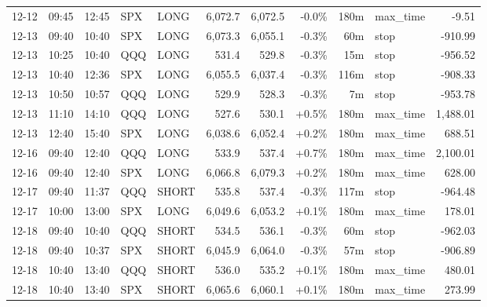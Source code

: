 \documentclass[11pt,a4paper,twoside]{article}
\begin{document}
\begin{center}
\begin{longtable}{>{\color{txtmain}}l l l l l r r r r >{\color{txtmain}}l r}
12-12 & 09:45 & 12:45 & SPX & LONG & 6,072.7 & 6,072.5 & \textcolor{lossred}{-0.0\%} & 180m & max\_time & \textcolor{lossred}{-9.51} \\
12-13 & 09:40 & 10:40 & SPX & LONG & 6,073.3 & 6,055.1 & \textcolor{lossred}{-0.3\%} & 60m & stop & \textcolor{lossred}{-910.99} \\
12-13 & 10:25 & 10:40 & QQQ & LONG & 531.4 & 529.8 & \textcolor{lossred}{-0.3\%} & 15m & stop & \textcolor{lossred}{-956.52} \\
12-13 & 10:40 & 12:36 & SPX & LONG & 6,055.5 & 6,037.4 & \textcolor{lossred}{-0.3\%} & 116m & stop & \textcolor{lossred}{-908.33} \\
12-13 & 10:50 & 10:57 & QQQ & LONG & 529.9 & 528.3 & \textcolor{lossred}{-0.3\%} & 7m & stop & \textcolor{lossred}{-953.78} \\
12-13 & 11:10 & 14:10 & QQQ & LONG & 527.6 & 530.1 & \textcolor{wingreen}{+0.5\%} & 180m & max\_time & \textcolor{wingreen}{1,488.01} \\
12-13 & 12:40 & 15:40 & SPX & LONG & 6,038.6 & 6,052.4 & \textcolor{wingreen}{+0.2\%} & 180m & max\_time & \textcolor{wingreen}{688.51} \\
12-16 & 09:40 & 12:40 & QQQ & LONG & 533.9 & 537.4 & \textcolor{wingreen}{+0.7\%} & 180m & max\_time & \textcolor{wingreen}{2,100.01} \\
12-16 & 09:40 & 12:40 & SPX & LONG & 6,066.8 & 6,079.3 & \textcolor{wingreen}{+0.2\%} & 180m & max\_time & \textcolor{wingreen}{628.00} \\
12-17 & 09:40 & 11:37 & QQQ & SHORT & 535.8 & 537.4 & \textcolor{lossred}{-0.3\%} & 117m & stop & \textcolor{lossred}{-964.48} \\
12-17 & 10:00 & 13:00 & SPX & LONG & 6,049.6 & 6,053.2 & \textcolor{wingreen}{+0.1\%} & 180m & max\_time & \textcolor{wingreen}{178.01} \\
12-18 & 09:40 & 10:40 & QQQ & SHORT & 534.5 & 536.1 & \textcolor{lossred}{-0.3\%} & 60m & stop & \textcolor{lossred}{-962.03} \\
12-18 & 09:40 & 10:37 & SPX & SHORT & 6,045.9 & 6,064.0 & \textcolor{lossred}{-0.3\%} & 57m & stop & \textcolor{lossred}{-906.89} \\
12-18 & 10:40 & 13:40 & QQQ & SHORT & 536.0 & 535.2 & \textcolor{wingreen}{+0.1\%} & 180m & max\_time & \textcolor{wingreen}{480.01} \\
12-18 & 10:40 & 13:40 & SPX & SHORT & 6,065.6 & 6,060.1 & \textcolor{wingreen}{+0.1\%} & 180m & max\_time & \textcolor{wingreen}{273.99} \\

\end{longtable}
\end{center}
\end{document}
